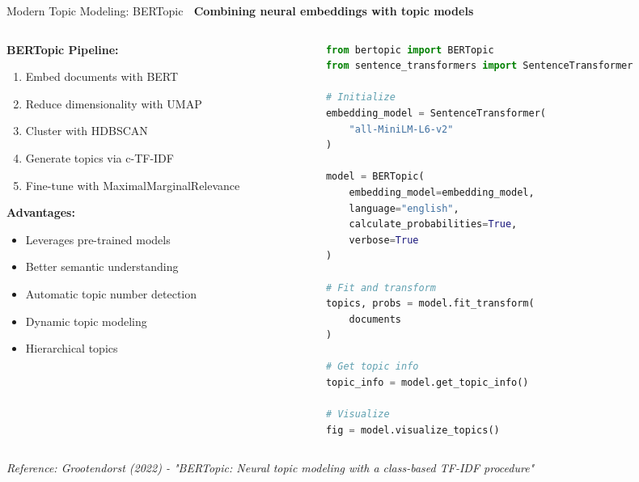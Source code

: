 \documentclass[aspectratio=169]{beamer}
\begin{document}
\begin{frame}[fragile]{Modern Topic Modeling: BERTopic 🎨}
\textbf{Combining neural embeddings with topic models}

\vspace{1em}

\begin{columns}[T]
\begin{column}{0.48\textwidth}
\textbf{BERTopic Pipeline:}
\begin{enumerate}\setlength{\itemsep}{0pt}
    \item Embed documents with BERT
    \item Reduce dimensionality with UMAP
    \item Cluster with HDBSCAN
    \item Generate topics via c-TF-IDF
    \item Fine-tune with MaximalMarginalRelevance
\end{enumerate}

\vspace{0.5em}
\textbf{Advantages:}
\begin{itemize}\setlength{\itemsep}{0pt}
    \item Leverages pre-trained models
    \item Better semantic understanding
    \item Automatic topic number detection
    \item Dynamic topic modeling
    \item Hierarchical topics
\end{itemize}
\end{column}

\begin{column}{0.48\textwidth}
\begin{lstlisting}[language=Python]
from bertopic import BERTopic
from sentence_transformers import SentenceTransformer

# Initialize
embedding_model = SentenceTransformer(
    "all-MiniLM-L6-v2"
)

model = BERTopic(
    embedding_model=embedding_model,
    language="english",
    calculate_probabilities=True,
    verbose=True
)

# Fit and transform
topics, probs = model.fit_transform(
    documents
)

# Get topic info
topic_info = model.get_topic_info()

# Visualize
fig = model.visualize_topics()
\end{lstlisting}
\end{column}
\end{columns}

\vspace{0.5em}
\small
\textit{Reference: Grootendorst (2022) - "BERTopic: Neural topic modeling with a class-based TF-IDF procedure"}
\end{frame}
\end{document}
